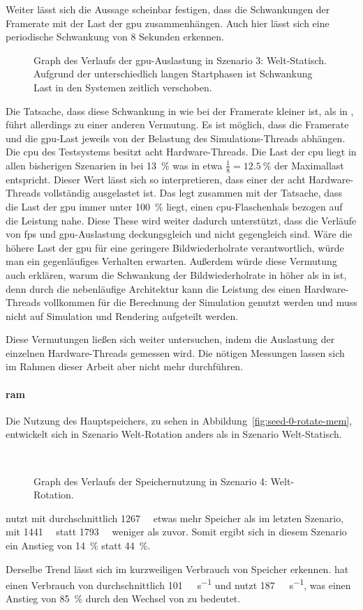 Weiter lässt sich die Aussage scheinbar festigen, dass die Schwankungen der Framerate mit der Last der \ac{gpu} zusammenhängen. Auch hier lässt sich eine periodische Schwankung von 8 Sekunden erkennen. 
\begin{figure}[!htbp]
	\caption[Graph des Verlaufs der -Auslastung in Szenario 4: Welt-Rotation.]{Graph des Verlaufs der \ac{gpu}-Auslastung in Szenario 3: Welt-Statisch. Aufgrund der unterschiedlich langen Startphasen ist Schwankung Last in den Systemen zeitlich verschoben.}\label{fig:seed-0-rotate-gpu}
\end{figure}
Die Tatsache, dass diese Schwankung in \sysA{} wie bei der Framerate kleiner ist, als in \sysB{}, führt allerdings zu einer anderen Vermutung. Es ist möglich, dass die Framerate und die \ac{gpu}-Last jeweils von der Belastung des Simulations-Threads abhängen. Die \ac{cpu} des Testsystems besitzt acht Hardware-Threads. Die Last der \ac{cpu} liegt in allen bisherigen Szenarien in \sysA{} bei \SI{13}{\percent} was in etwa $\frac{1}{8} = \SI{12,5}{\percent}$ der Maximallast entspricht. Dieser Wert lässt sich so interpretieren, dass einer der acht Hardware-Threads vollständig ausgelastet ist. Das legt zusammen mit der Tatsache, dass die Last der \ac{gpu} immer unter \SI{100}{\percent} liegt, einen \ac{cpu}-Flaschenhals bezogen auf die Leistung nahe. Diese These wird weiter dadurch unterstützt, dass die Verläufe von \ac{fps} und \ac{gpu}-Auslastung deckungsgleich und nicht gegengleich sind. Wäre die höhere Last der \ac{gpu} für eine geringere Bildwiederholrate verantwortlich, würde man ein gegenläufiges Verhalten erwarten. Außerdem würde diese Vermutung auch erklären, warum die Schwankung der Bildwiederholrate in \sysB{} höher als in \sysA{} ist, denn durch die nebenläufige Architektur kann die Leistung des einen Hardware-Threads vollkommen für die Berechnung der Simulation genutzt werden und muss nicht auf Simulation und Rendering aufgeteilt werden.

Diese Vermutungen ließen sich weiter untersuchen, indem die Auslastung der einzelnen Hardware-Threads gemessen wird. Die nötigen Messungen lassen sich im Rahmen dieser Arbeit aber nicht mehr durchführen. 

\paragraph{\ac{ram}}
Die Nutzung des Hauptspeichers, zu sehen in Abbildung~\vref{fig:seed-0-rotate-mem}, entwickelt sich in Szenario Welt-Rotation anders als in Szenario Welt-Statisch.
\begin{figure}[!htbp]
	\\
	\caption{Graph des Verlaufs der Speichernutzung in Szenario 4: Welt-Rotation.}\label{fig:seed-0-rotate-mem}	
\end{figure} 
\sysA{} nutzt mit durchschnittlich \SI{1267}{\mega\byte} etwas mehr Speicher als im letzten Szenario, \sysB{} mit \SI{1441}{\mega\byte} statt \SI{1793}{\mega\byte} weniger als zuvor. Somit ergibt sich in diesem Szenario ein Anstieg von \SI{14}{\percent} statt \SI{44}{\percent}. 

Derselbe Trend lässt sich im kurzweiligen Verbrauch von Speicher erkennen. \sysA{} hat einen Verbrauch von durchschnittlich \SI{101}{\mega\byte\per\second} und \sysB{} nutzt \SI{187}{\mega\byte\per\second}, was einen Anstieg von \SI{85}{\percent} durch den Wechsel von \sysA{} zu \sysB{} bedeutet.
